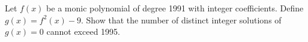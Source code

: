Let $f(x)$ be a monic polynomial of degree 1991 with integer coefficients. Define $g(x) = f^2(x) - 9$. Show that the number of distinct integer solutions of $g(x) = 0$ cannot exceed 1995.
